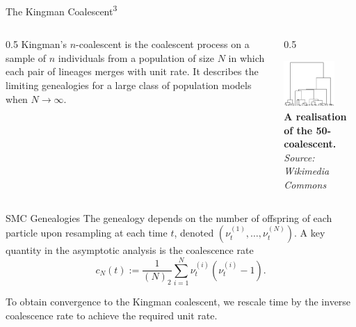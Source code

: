 \documentclass[final, 12pt]{beamer}
\newlength{\colwidth}
\newcommand{\vt}[2][t]{\nu_{#1}^{(#2)}}
\begin{document}
\begin{frame}
\begin{columns}
\begin{column}{\colwidth}
\begin{block}{The Kingman Coalescent\textsuperscript{3}}
\begin{columns}
\begin{column}{0.5\colwidth}
Kingman's $n$-coalescent is the coalescent process on a sample of $n$ individuals from a population of size $N$ in which each pair of lineages merges with unit rate.
It describes the limiting genealogies for a large class of population models when $N\to\infty$.
\end{column}
\begin{column}{0.5\colwidth}
\begin{center}
\includegraphics[width=0.7\textwidth]{../kingman.png}\\
\small{
\textbf{A realisation of the 50-coalescent.}
\textit{Source: Wikimedia Commons}
}
\end{center}
\end{column}
\end{columns}
\end{block}

\begin{block}{SMC Genealogies}
The genealogy depends on the number of offspring of each particle upon resampling at each time $t$, denoted $(\vt{1}, \dots, \vt{N})$.
A key quantity in the asymptotic analysis is the coalescence rate
\begin{equation*}
c_N(t) := \frac{1}{(N)_2} \sum_{i=1}^{N} \vt{i}(\vt{i}-1).
\end{equation*}

To obtain convergence to the Kingman coalescent, we rescale time by the inverse coalescence rate to achieve the required unit rate.\\[10pt]


\end{block}
\end{column}
\end{columns}
\end{frame}
\end{document}
